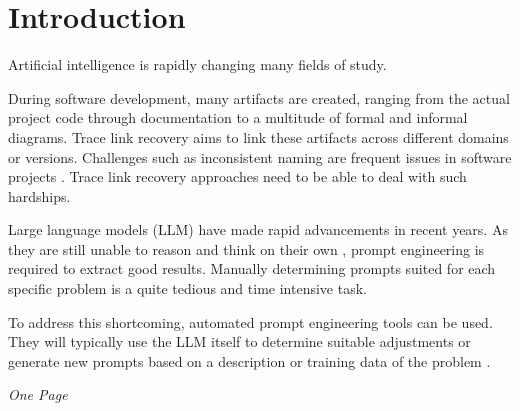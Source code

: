 
\chapter{Introduction}
\label{ch:Introduction}

Artificial intelligence is rapidly changing many fields of study.

During software development, many artifacts are created, ranging from the actual project code through documentation to a multitude of formal and informal diagrams. Trace link recovery aims to link these artifacts across different domains or versions. Challenges such as inconsistent naming are frequent issues in software projects \cite{wohlrab2019ImprovingConsistency}. Trace link recovery approaches need to be able to deal with such hardships. 

Large language models (LLM) have made rapid advancements in recent years. As they are still unable to reason and think on their own \cite{shojaee2025IllusionThinking}, prompt engineering is required to extract good results. Manually determining prompts suited for each specific problem is a quite tedious and time intensive task. 

To address this shortcoming, automated prompt engineering tools can be used. They will typically use the LLM itself to determine suitable adjustments or generate new prompts based on a description or training data of the problem \cite{ape}.

\textit{One Page}